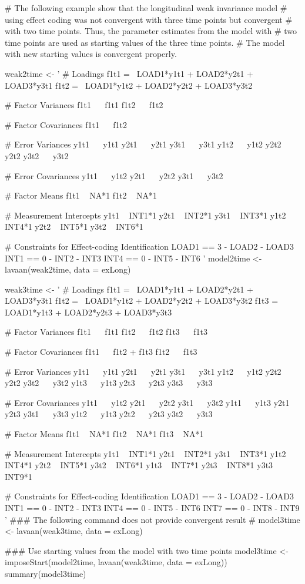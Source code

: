 \documentclass[a4paper]{book}
\begin{document}
\begin{Examples}
\begin{ExampleCode}
# The following example show that the longitudinal weak invariance model
# using effect coding was not convergent with three time points but convergent
# with two time points. Thus, the parameter estimates from the model with
# two time points are used as starting values of the three time points.
# The model with new starting values is convergent properly.

weak2time <- ' 
	# Loadings
	f1t1 =~ LOAD1*y1t1 + LOAD2*y2t1 + LOAD3*y3t1
    f1t2 =~ LOAD1*y1t2 + LOAD2*y2t2 + LOAD3*y3t2
	
	# Factor Variances
	f1t1 ~~ f1t1
	f1t2 ~~ f1t2
	
	# Factor Covariances
	f1t1 ~~ f1t2 
	
	# Error Variances
	y1t1 ~~ y1t1
	y2t1 ~~ y2t1
	y3t1 ~~ y3t1
	y1t2 ~~ y1t2
	y2t2 ~~ y2t2
	y3t2 ~~ y3t2
	
	# Error Covariances
	y1t1 ~~ y1t2 
	y2t1 ~~ y2t2 
	y3t1 ~~ y3t2
	
	# Factor Means
	f1t1 ~ NA*1
	f1t2 ~ NA*1
	
	# Measurement Intercepts
	y1t1 ~ INT1*1
	y2t1 ~ INT2*1
	y3t1 ~ INT3*1
	y1t2 ~ INT4*1
	y2t2 ~ INT5*1
	y3t2 ~ INT6*1
	
	# Constraints for Effect-coding Identification
	LOAD1 == 3 - LOAD2 - LOAD3
	INT1 == 0 - INT2 - INT3
	INT4 == 0 - INT5 - INT6
'
model2time <- lavaan(weak2time, data = exLong)

weak3time <- ' 
	# Loadings
	f1t1 =~ LOAD1*y1t1 + LOAD2*y2t1 + LOAD3*y3t1
    f1t2 =~ LOAD1*y1t2 + LOAD2*y2t2 + LOAD3*y3t2
    f1t3 =~ LOAD1*y1t3 + LOAD2*y2t3 + LOAD3*y3t3
	
	# Factor Variances
	f1t1 ~~ f1t1
	f1t2 ~~ f1t2
	f1t3 ~~ f1t3
	
	# Factor Covariances
	f1t1 ~~ f1t2 + f1t3
	f1t2 ~~ f1t3 
	
	# Error Variances
	y1t1 ~~ y1t1
	y2t1 ~~ y2t1
	y3t1 ~~ y3t1
	y1t2 ~~ y1t2
	y2t2 ~~ y2t2
	y3t2 ~~ y3t2
	y1t3 ~~ y1t3
	y2t3 ~~ y2t3
	y3t3 ~~ y3t3
	
	# Error Covariances
	y1t1 ~~ y1t2 
	y2t1 ~~ y2t2 
	y3t1 ~~ y3t2
	y1t1 ~~ y1t3 
	y2t1 ~~ y2t3 
	y3t1 ~~ y3t3
	y1t2 ~~ y1t3
	y2t2 ~~ y2t3 
	y3t2 ~~ y3t3
	
	# Factor Means
	f1t1 ~ NA*1
	f1t2 ~ NA*1
	f1t3 ~ NA*1
	
	# Measurement Intercepts
	y1t1 ~ INT1*1
	y2t1 ~ INT2*1
	y3t1 ~ INT3*1
	y1t2 ~ INT4*1
	y2t2 ~ INT5*1
	y3t2 ~ INT6*1
	y1t3 ~ INT7*1
	y2t3 ~ INT8*1
	y3t3 ~ INT9*1
	
	# Constraints for Effect-coding Identification
	LOAD1 == 3 - LOAD2 - LOAD3
	INT1 == 0 - INT2 - INT3
	INT4 == 0 - INT5 - INT6
	INT7 == 0 - INT8 - INT9
'
### The following command does not provide convergent result
# model3time <- lavaan(weak3time, data = exLong)

### Use starting values from the model with two time points
model3time <- imposeStart(model2time, lavaan(weak3time, data = exLong))
summary(model3time)
\end{ExampleCode}
\end{Examples}
\end{document}
